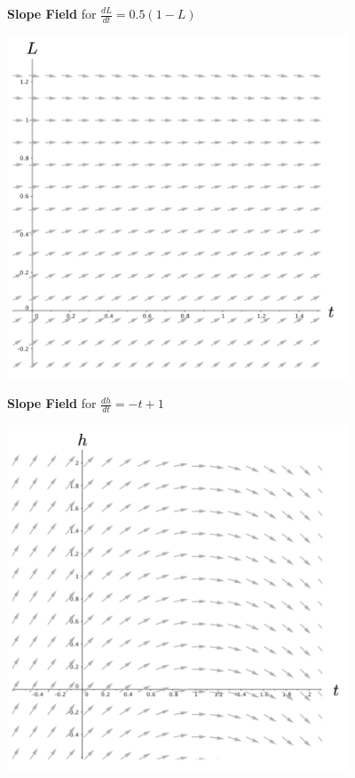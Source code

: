\clearpage

\begin{center}
\textbf{Slope Field} for $\displaystyle\frac{dL}{dt} = 0.5(1 - L)$

\includegraphics[width=4in]{03/03SlopeField1.png}

\vspace{.5cm}
\textbf{Slope Field} for $\displaystyle\frac{dh}{dt} = -t + 1$

\includegraphics[width=4in]{03/03SlopeField2.png}\\
\end{center}

\clearpage

